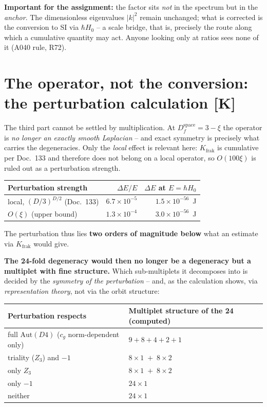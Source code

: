 \documentclass[11pt]{report}
\begin{document}
\textbf{Important for the assignment:} the factor sits \emph{not}
in the spectrum but in the \emph{anchor}. The dimensionless
eigenvalues $|k|^2$ remain unchanged; what is corrected is the
conversion to SI via $\hbar H_0$ -- a scale bridge, that is,
precisely the route along which a cumulative quantity may act.
Anyone looking only at ratios sees none of it (A040 rule, R72).

\section{The operator, not the conversion: the perturbation calculation [K]}

The third part cannot be settled by multiplication. At
$D_f^\text{space} = 3-\xi$ the operator is \emph{no longer an
exactly smooth Laplacian} -- and exact symmetry is precisely what
carries the degeneracies. Only the \emph{local} effect is relevant
here: $K_\text{frak}$ is cumulative per Doc.~133 and therefore
does not belong on a local operator, so $O(100\xi)$ is ruled out
as a perturbation strength.

\begin{center}
\begin{tabular}{lrr}
\toprule
Perturbation strength & $\Delta E/E$ & $\Delta E$ at
  $E = \hbar H_0$ \\
\midrule
local, $(D/3)^{D/2}$ (Doc.~133) & $6.7\times10^{-5}$ &
  $1.5\times10^{-56}$~J \\
$O(\xi)$ (upper bound) & $1.3\times10^{-4}$ &
  $3.0\times10^{-56}$~J \\
\bottomrule
\end{tabular}
\end{center}

\noindent The perturbation thus lies \textbf{two orders of
magnitude below} what an estimate via $K_\text{frak}$ would
give.

\noindent \textbf{The 24-fold degeneracy would then no longer be a
degeneracy but a multiplet with fine structure.} Which
sub-multiplets it decomposes into is decided by the \emph{symmetry
of the perturbation} -- and, as the calculation shows, via
\emph{representation theory}, not via the orbit structure:

\begin{center}
\begin{tabular}{ll}
\toprule
Perturbation respects & Multiplet structure of the 24 (computed) \\
\midrule
full $\text{Aut}(D4)$ ($c_g$ norm-dependent only) &
  $9 + 8 + 4 + 2 + 1$ \\
triality ($Z_3$) and $-1$ & $8\times1 \;+\; 8\times2$ \\
only $Z_3$ & $8\times1 \;+\; 8\times2$ \\
only $-1$ & $24\times1$ \\
neither & $24\times1$ \\
\bottomrule
\end{tabular}
\end{center}
\end{document}
